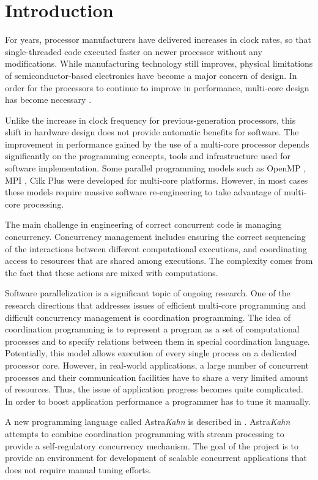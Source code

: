 \chapter{Introduction}
For years, processor manufacturers have delivered increases in clock rates, so that single-threaded code executed faster on newer processor without any modifications. While manufacturing technology still improves, physical limitations of semiconductor-based electronics have become a major concern of design. In order for the processors to continue to improve in performance, multi-core design has become necessary \cite{sutter}.

Unlike the increase in clock frequency for previous-generation processors, this shift in hardware design does not provide automatic benefits for software. The improvement in performance gained by the use of a multi-core processor depends significantly on the programming concepts, tools and infrastructure used for software implementation. Some parallel programming models such as OpenMP \cite{openmp}, MPI \cite{mpi}, Cilk Plus \cite{cilk} were developed for multi-core platforms. However, in most cases these models require massive software re-engineering to take advantage of multi-core processing.

The main challenge in engineering of correct concurrent code is managing concurrency. Concurrency management includes ensuring the correct sequencing of the interactions between different computational executions, and coordinating access to resources that are shared among executions. The complexity comes from the fact that these actions are mixed with computations.

Software parallelization is a significant topic of ongoing research. One of the research directions that addresses issues of efficient multi-core programming and difficult concurrency management is coordination programming. The idea of coordination programming is to represent a program as a set of computational processes and to specify relations between them in special coordination language. Potentially, this model allows execution of every single process on a dedicated processor core. However, in real-world applications, a large number of concurrent processes and their communication facilities have to share a very limited amount of resources. Thus, the issue of application progress becomes quite complicated. In order to boost application performance a programmer has to tune it manually.

A new programming language called Astra\emph{Kahn} is described in \cite{astrakahn}. Astra\emph{Kahn} attempts to combine coordination programming with stream processing to provide a self-regulatory concurrency mechanism. The goal of the project is to provide an environment for development of scalable concurrent applications that does not require manual tuning efforts.


